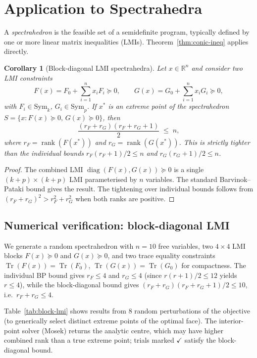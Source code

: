 \documentclass[11pt,a4paper]{article}
\newtheorem{corollary}[theorem]{Corollary}
\theoremstyle{definition}
\newcommand{\R}{\mathbb{R}}
\newcommand{\rank}{\operatorname{rank}}
\newcommand{\Sym}{\mathrm{Sym}}
\newcommand{\Tr}{\operatorname{Tr}}
\begin{document}
\section{Application to Spectrahedra}
\label{sec:spectrahedra}

A \emph{spectrahedron} is the feasible set of a semidefinite program,
typically defined by one or more linear matrix inequalities (LMIs).
Theorem~\ref{thm:conic-ineq} applies directly.

\begin{corollary}[Block-diagonal LMI spectrahedra]
\label{cor:block-lmi}
Let $x \in \R^n$ and consider two LMI constraints
\[
  F(x) = F_0 + \textstyle\sum_{i=1}^n x_i F_i \succeq 0, \qquad
  G(x) = G_0 + \textstyle\sum_{i=1}^n x_i G_i \succeq 0,
\]
with $F_i \in \Sym_k$, $G_i \in \Sym_p$.  If $x^*$ is an extreme
point of the spectrahedron $S = \{x : F(x) \succeq 0,\, G(x) \succeq 0\}$,
then
\[
  \frac{(r_F + r_G)(r_F + r_G + 1)}{2} \;\leq\; n,
\]
where $r_F = \rank(F(x^*))$ and $r_G = \rank(G(x^*))$.  This is
strictly tighter than the individual bounds
$r_F(r_F+1)/2 \leq n$ and $r_G(r_G+1)/2 \leq n$.
\end{corollary}

\begin{proof}
The combined LMI $\operatorname{diag}(F(x), G(x)) \succeq 0$ is a
single $(k{+}p) \times (k{+}p)$ LMI parameterised by $n$ variables.
The standard Barvinok--Pataki bound gives the result.  The tightening
over individual bounds follows from $(r_F + r_G)^2 > r_F^2 + r_G^2$
when both ranks are positive.
\end{proof}

\subsection{Numerical verification: block-diagonal LMI}

We generate a random spectrahedron with $n = 10$ free variables,
two $4 \times 4$ LMI blocks $F(x) \succeq 0$ and $G(x) \succeq 0$,
and two trace equality constraints
$\Tr(F(x)) = \Tr(F_0)$, $\Tr(G(x)) = \Tr(G_0)$ for compactness.
The individual BP bound gives $r_F \leq 4$ and $r_G \leq 4$
(since $r(r{+}1)/2 \leq 12$ yields $r \leq 4$), while the
block-diagonal bound gives
$(r_F + r_G)(r_F + r_G + 1)/2 \leq 10$, i.e.\
$r_F + r_G \leq 4$.

Table~\ref{tab:block-lmi} shows results from 8 random
perturbations of the objective (to generically select distinct
extreme points of the optimal face).  The interior-point solver
(Mosek) returns the analytic centre, which may have higher
combined rank than a true extreme point; trials marked $\checkmark$
satisfy the block-diagonal bound.
\end{document}
